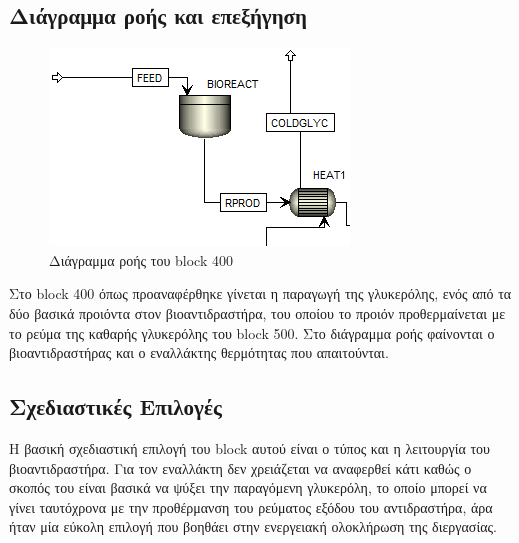 \documentclass[11pt]{article}
\begin{document}
\subsection{Διάγραμμα ροής και επεξήγηση}
\label{sec:org8186ac1}
\begin{figure}[htbp]
\centering
\includegraphics[width=.9\linewidth]{Διάγραμμα_ροής_και_Επεξήγηση/2023-01-12_16-53-41_screenshot.png}
\caption{Διάγραμμα ροής του block 400}
\end{figure}

Στο block 400 όπως προαναφέρθηκε γίνεται η παραγωγή της γλυκερόλης, ενός από τα δύο βασικά προιόντα στον βιοαντιδραστήρα, του οποίου το προιόν προθερμαίνεται με το ρεύμα της καθαρής γλυκερόλης του block 500. Στο διάγραμμα ροής φαίνονται ο βιοαντιδραστήρας και ο εναλλάκτης θερμότητας που απαιτούνται.

\subsection{Σχεδιαστικές Επιλογές}
\label{sec:org4a587e4}
Η βασική σχεδιαστική επιλογή του block αυτού είναι ο τύπος και η λειτουργία του βιοαντιδραστήρα. Για τον εναλλάκτη δεν χρειάζεται να αναφερθεί κάτι καθώς ο σκοπός του είναι βασικά να ψύξει την παραγόμενη γλυκερόλη, το οποίο μπορεί να γίνει ταυτόχρονα με την προθέρμανση του ρεύματος εξόδου του αντιδραστήρα, άρα ήταν μία εύκολη επιλογή που βοηθάει στην ενεργειακή ολοκλήρωση της διεργασίας.
\end{document}
